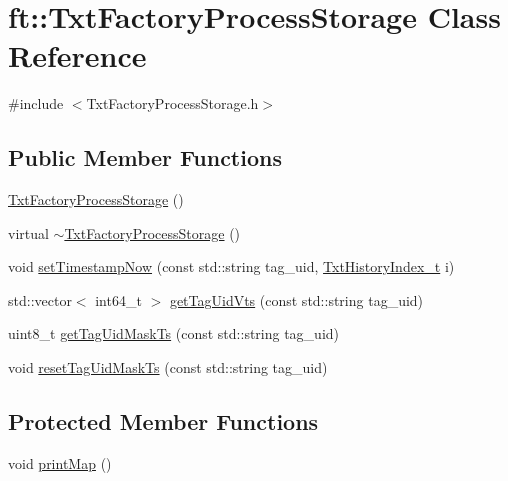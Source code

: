 \hypertarget{classft_1_1_txt_factory_process_storage}{}\section{ft\+:\+:Txt\+Factory\+Process\+Storage Class Reference}
\label{classft_1_1_txt_factory_process_storage}


{\ttfamily \#include $<$Txt\+Factory\+Process\+Storage.\+h$>$}

\subsection*{Public Member Functions}
\begin{DoxyCompactItemize}
\item 
\hyperlink{classft_1_1_txt_factory_process_storage_a0e88aec0c0f9dc6e00de46ecdb833adc}{Txt\+Factory\+Process\+Storage} ()
\item 
virtual \hyperlink{classft_1_1_txt_factory_process_storage_a52e8ba413486356acd2d218204ea5f10}{$\sim$\+Txt\+Factory\+Process\+Storage} ()
\item 
void \hyperlink{classft_1_1_txt_factory_process_storage_a460fae87650acf9a261efbb04907d90a}{set\+Timestamp\+Now} (const std\+::string tag\+\_\+uid, \hyperlink{namespaceft_a87eb4112317a6f3c7ade8f26b6f8c1c8}{Txt\+History\+Index\+\_\+t} i)
\item 
std\+::vector$<$ int64\+\_\+t $>$ \hyperlink{classft_1_1_txt_factory_process_storage_a9884d553f0f777b7c1e808ae544ec55a}{get\+Tag\+Uid\+Vts} (const std\+::string tag\+\_\+uid)
\item 
uint8\+\_\+t \hyperlink{classft_1_1_txt_factory_process_storage_a5a1c6bd13e95364f47ffc75b1854a455}{get\+Tag\+Uid\+Mask\+Ts} (const std\+::string tag\+\_\+uid)
\item 
void \hyperlink{classft_1_1_txt_factory_process_storage_a98be66a6ae2ab4ab312adae2b0203545}{reset\+Tag\+Uid\+Mask\+Ts} (const std\+::string tag\+\_\+uid)
\end{DoxyCompactItemize}
\subsection*{Protected Member Functions}
\begin{DoxyCompactItemize}
\item 
void \hyperlink{classft_1_1_txt_factory_process_storage_a5150437507748d2c569becdd0359fc31}{print\+Map} ()
\end{DoxyCompactItemize}
